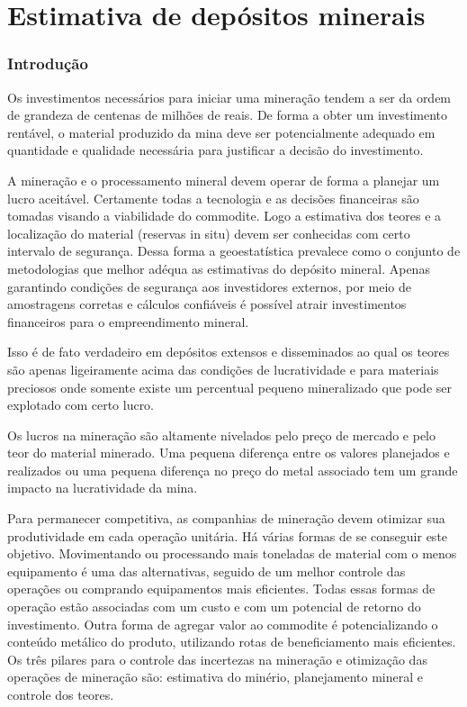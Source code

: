 \textbf{}

\chapter{Estimativa de depósitos minerais}

\subsection{Introdução}

Os investimentos necessários para iniciar uma mineração tendem a ser da ordem de grandeza de centenas de milhões de reais. De forma a obter um investimento rentável, o material produzido da mina deve ser potencialmente adequado em quantidade e qualidade necessária para justificar a decisão do investimento.

 A mineração e o processamento mineral devem operar de forma a planejar um lucro aceitável. Certamente todas a tecnologia e as decisões financeiras são tomadas visando a viabilidade do commodite. Logo a estimativa dos teores e a localização do material (reservas in situ) devem ser conhecidas com certo intervalo de segurança. Dessa forma a geoestatística prevalece como o conjunto de metodologias que melhor adéqua as estimativas do depósito mineral.  Apenas garantindo condições de segurança aos investidores externos, por meio de amostragens corretas e cálculos confiáveis é possível atrair investimentos financeiros para o empreendimento mineral. 
 
Isso é de fato verdadeiro em depósitos extensos e disseminados ao qual os teores são apenas ligeiramente acima das condições de lucratividade e para materiais preciosos onde somente existe um percentual pequeno mineralizado que pode ser explotado com certo lucro. 
 
 Os lucros na mineração são altamente nivelados pelo preço de mercado e pelo teor do material minerado. Uma pequena diferença entre os valores planejados e realizados ou uma pequena diferença no preço do metal associado tem um grande impacto na lucratividade da mina. 
 
 Para permanecer competitiva, as companhias de mineração devem otimizar sua produtividade em cada operação unitária. Há várias formas de se conseguir este objetivo. Movimentando ou processando mais toneladas de material com o menos equipamento é uma das alternativas, seguido de um melhor controle das operações ou comprando equipamentos mais eficientes. Todas essas formas de operação estão associadas com um custo e  com um potencial de retorno do investimento. Outra forma de agregar valor ao commodite é potencializando o conteúdo metálico do produto, utilizando rotas de beneficiamento mais eficientes. 
 Os três pilares para o controle das incertezas na mineração e otimização das operações de mineração são: estimativa do minério, planejamento mineral e controle dos teores.
 
